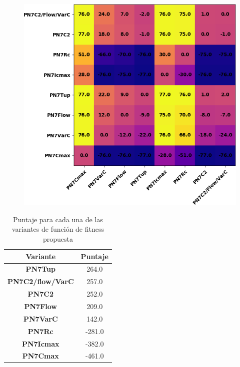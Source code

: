 \begin{figure}[hbtp]
    \centering
    \includegraphics[scale=.8]{Imagenes/fitnesscomp.png}
    \label{fig:fcomp}
\end{figure}
\begin{table}[hbtp]
    \centering
\begin{tabular}{@{}cc@{}}
Variante & Puntaje \\ \midrule
\toprule
    \textbf{PN7Tup} & 264.0 \\ \midrule
    \textbf{PN7C2/flow/VarC} & 257.0 \\ \midrule
    \textbf{PN7C2} & 252.0 \\ \midrule
    \textbf{PN7Flow} & 209.0 \\ \midrule
    \textbf{PN7VarC} & 142.0 \\ \midrule
    \textbf{PN7Rc} & -281.0 \\ \midrule
    \textbf{PN7Icmax} & -382.0 \\ \midrule
    \textbf{PN7Cmax} & -461.0 \\ \midrule
\end{tabular}
    \caption{Puntaje para cada una de las variantes de función de fitness propuesta}
    \label{tab:fcomp}
\end{table}

